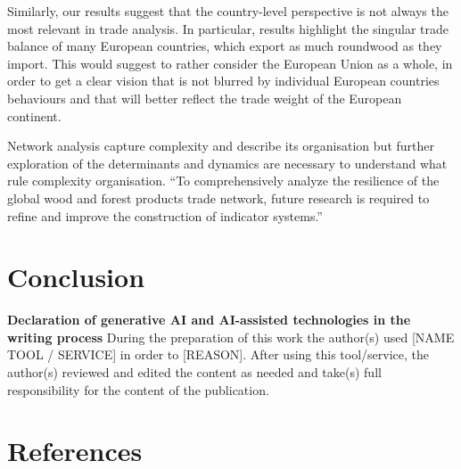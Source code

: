 \documentclass[
  authoryear,
  review,
  3p]{elsarticle}
\begin{document}
Similarly, our results suggest that the country-level perspective is not
always the most relevant in trade analysis. In particular, results
highlight the singular trade balance of many European countries, which
export as much roundwood as they import. This would suggest to rather
consider the European Union as a whole, in order to get a clear vision
that is not blurred by individual European countries behaviours and that
will better reflect the trade weight of the European continent.

Network analysis capture complexity and describe its organisation but
further exploration of the determinants and dynamics are necessary to
understand what rule complexity organisation. ``To comprehensively
analyze the resilience of the global wood and forest products trade
network, future research is required to refine and improve the
construction of indicator systems.''

\section{Conclusion}\label{conclusion}

\textbf{Declaration of generative AI and AI-assisted technologies in the
writing process} During the preparation of this work the author(s) used
{[}NAME TOOL / SERVICE{]} in order to {[}REASON{]}. After using this
tool/service, the author(s) reviewed and edited the content as needed
and take(s) full responsibility for the content of the publication.

\section*{References}\label{references}

\renewcommand{\bibsection}{}

\end{document}
